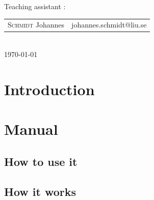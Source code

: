 \documentclass[12pt,a4paper]{article}
\begin{document}
\begin{titlepage}
\normalsize
Teaching assistant :\\[0.2cm]
{\begin{tabular}{ll}
\textsc{Schmidt} Johannes & johannes.schmidt@liu.se \\
\end{tabular}}
\\[2cm]

\vfill
{\normalsize \today} %

\newpage

\end{titlepage}


\clearpage
\thispagestyle{empty}
\tableofcontents
\clearpage
{}


\section{Introduction}




\section{Manual}
\subsection{How to use it}


\subsection{How it works}

\end{document}

